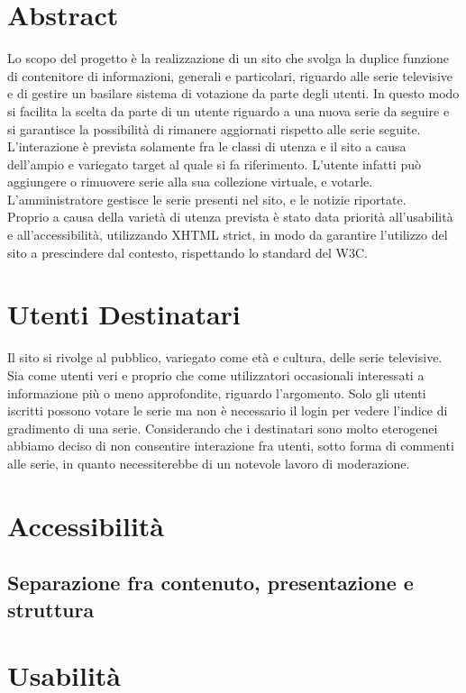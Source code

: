 \documentclass{tecweb}
\begin{document}
	\section{Abstract}
	Lo scopo del progetto è la realizzazione di un sito che svolga la duplice funzione di contenitore di informazioni, generali e particolari, riguardo alle serie televisive e di gestire un basilare sistema di votazione da parte degli utenti. In questo modo si facilita la scelta da parte di un utente riguardo a una nuova serie da seguire e si garantisce la possibilità di rimanere aggiornati rispetto alle serie seguite. \\
	L'interazione è prevista solamente fra le classi di utenza e il sito a causa dell'ampio e variegato target al quale si fa riferimento. L'utente infatti può aggiungere o rimuovere serie alla sua collezione virtuale, e votarle. L'amministratore gestisce le serie presenti nel sito, e le notizie riportate. \\
	Proprio a causa della varietà di utenza prevista è stato data priorità all'usabilità e all'accessibilità, utilizzando XHTML strict, in modo da garantire l'utilizzo del sito a prescindere dal contesto, rispettando lo standard del W3C.
	\newpage
	\section{Utenti Destinatari}
	Il sito si rivolge al pubblico, variegato come età e cultura, delle serie televisive. Sia come utenti veri e proprio che come utilizzatori occasionali interessati a informazione più o meno approfondite, riguardo l'argomento. Solo gli utenti iscritti possono votare le serie ma non è necessario il login per vedere l'indice di gradimento di una serie. Considerando che i destinatari sono molto eterogenei abbiamo deciso di non consentire interazione fra utenti, sotto forma di commenti alle serie, in quanto necessiterebbe di un notevole lavoro di moderazione.
	\newpage
	
	
	\section{Accessibilità}
	\subsection{Separazione fra contenuto, presentazione e struttura}
	
	\newpage
	\section{Usabilità}
	\newpage
\end{document}

